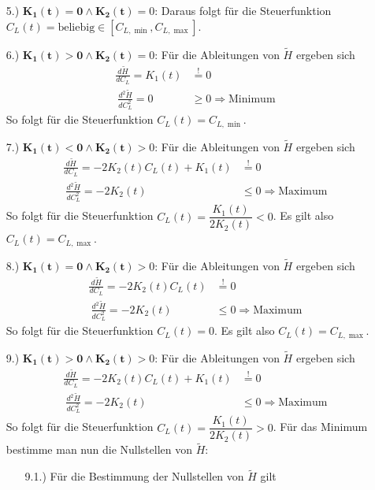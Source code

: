\begin{enumerate}
\begin{enumerate}
        \item[5.)] $\mathbf{K_1(t) = 0 \wedge K_2(t)} = 0$: Daraus folgt für die Steuerfunktion $C_L(t) = \text{beliebig} \in [C_{L, \min},C_{L, \max}]$.
        \item[6.)] $\mathbf{K_1(t) > 0 \wedge K_2(t)} = 0$: Für die Ableitungen von $\tilde{H}$ ergeben sich
        \[\begin{split}
        \frac{d \tilde{H}}{d C_L} = K_1(t) &\stackrel{!}{=} 0 \\\
        \frac{d^2 \tilde{H}}{d C_L^2} = 0 &\geq 0 \Rightarrow \text{Minimum}
        \end{split}\]
        So folgt für die Steuerfunktion $C_L(t) = C_{L, \min}$.
        \item[7.)] $\mathbf{K_1(t) < 0 \wedge K_2(t)} > 0$: Für die Ableitungen von $\tilde{H}$ ergeben sich
        \[\begin{split}
        \frac{d \tilde{H}}{d C_L} = - 2 K_2(t) C_L(t) + K_1(t) &\stackrel{!}{=} 0 \\\
        \frac{d^2 \tilde{H}}{d C_L^2} = - 2 K_2(t) &\leq 0 \Rightarrow \text{Maximum}
        \end{split}\]
        So folgt für die Steuerfunktion $C_L(t) = \dfrac{K_1(t)}{2 K_2(t)} < 0$. Es gilt also $C_L(t) = C_{L, \max}$.
        \item[8.)] $\mathbf{K_1(t) = 0 \wedge K_2(t)} > 0$: Für die Ableitungen von $\tilde{H}$ ergeben sich
        \[\begin{split}
        \frac{d \tilde{H}}{d C_L} = - 2 K_2(t) C_L(t) &\stackrel{!}{=} 0 \\\
        \frac{d^2 \tilde{H}}{d C_L^2} = - 2 K_2(t) &\leq 0 \Rightarrow \text{Maximum}
        \end{split}\]
        So folgt für die Steuerfunktion $C_L(t) = 0$. Es gilt also $C_L(t) = C_{L, \max}$.
\item[9.)] $\mathbf{K_1(t) > 0 \wedge K_2(t)} > 0$: Für die Ableitungen von $\tilde{H}$ ergeben sich
\[\begin{split}
\frac{d \tilde{H}}{d C_L} = - 2 K_2(t) C_L(t) + K_1(t) &\stackrel{!}{=} 0 \\\
\frac{d^2 \tilde{H}}{d C_L^2} = - 2 K_2(t) &\leq 0 \Rightarrow \text{Maximum}
\end{split}\]
So folgt für die Steuerfunktion $C_L(t) = \dfrac{K_1(t)}{2 K_2(t)} > 0$. Für das Minimum bestimme man nun die Nullstellen von $\tilde{H}$:
\begin{enumerate}
\item[9.1.)] Für die Bestimmung der Nullstellen von $\tilde{H}$ gilt

\end{enumerate}
\end{enumerate}
\end{enumerate}

